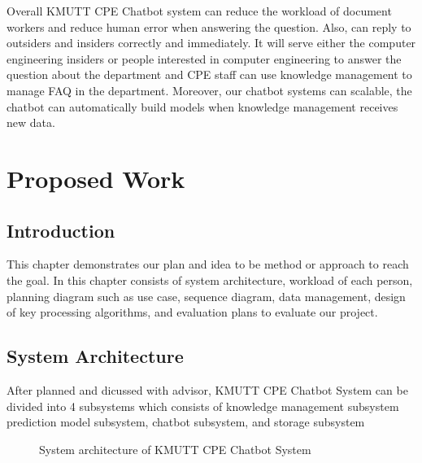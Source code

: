\documentclass[12pt,oneside,openright,a4paper]{cpe-english-project}
\begin{document}
Overall KMUTT CPE Chatbot system can reduce the workload of document workers and reduce human
error when answering the question. Also, can reply to outsiders and insiders correctly and
immediately. It will serve either the computer engineering insiders or people interested in
computer engineering to answer the question about the department and CPE staff can use
knowledge management to manage FAQ in the department.
Moreover, our chatbot systems can scalable, the chatbot can automatically build models
when knowledge management receives new data.

\chapter{Proposed Work}

\section{Introduction}
This chapter demonstrates our plan and idea to be method or approach to reach the goal.
In this chapter consists of system architecture, workload of each person, planning diagram such as
use case, sequence diagram, data management, design of key processing algorithms, and evaluation plans to evaluate our project.

\section{System Architecture}
\label{ch3_system_architecture}
After planned and dicussed with advisor, KMUTT CPE Chatbot System can be divided into 4 subsystems
which consists of knowledge management subsystem
 prediction model subsystem, chatbot subsystem, and storage subsystem

\begin{figure}[h!]
	\centering
	\setlength{\fboxrule}{0.2mm}
	\setlength{\fboxsep}{0.5cm}
	\caption{System architecture of KMUTT CPE Chatbot System}
	\label{fig:System architecture of KMUTT CPE Chatbot System}
\end{figure}
\end{document}

